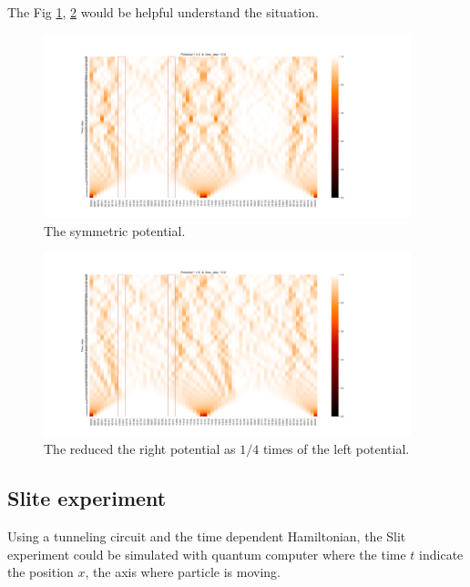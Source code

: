 The Fig \ref{fig:quantum_tunneling_simulation}, \ref{fig:quantum_tunneling_simulation2} would be helpful understand the situation.

\begin{figure}
    \centering
    \includegraphics[width=0.95\textwidth]{media/sym_8_v_4.0.png}
    \caption{
        The symmetric potential. }
    \label{fig:quantum_tunneling_simulation}
\end{figure}

\begin{figure}
    \centering
    \includegraphics[width=0.95\textwidth]{media/asym_8_v_4.0.png}
    \caption{
        The reduced the right potential as $1/4$ times of the left potential.}
    \label{fig:quantum_tunneling_simulation2}
\end{figure}

\subsection{Slite experiment}
Using a tunneling circuit and 
the time dependent Hamiltonian, the Slit experiment 
could be simulated with  quantum computer where the time $t$ 
indicate the position $x$, the axis where particle is moving.
\subsection{}
